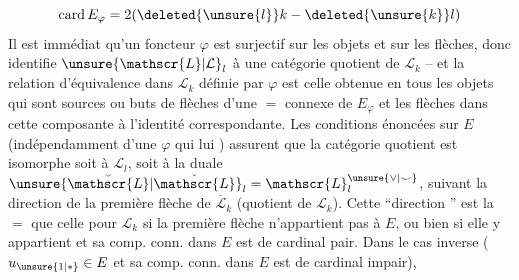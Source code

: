  
\[
\operatorname{card}E_\varphi=2(\deleted{\unsure{l}}k-\deleted{\unsure{k}}l)
\]
Il est immédiat qu'un foncteur $\varphi$ est surjectif
sur les objets et sur les flèches, donc identifie
$\unsure{\mathscr{L}|\mathcal{L}}_l$ à une catégorie quotient de $\mathscr{L}_k$ -- 
et la relation d'équivalence dans $\mathscr{L}_k$ définie
par $\varphi$ est celle obtenue en  
tous les objets qui sont sources ou buts de
flèches d'une $=$  connexe  de $E_\varphi$
\diagram{\begin{tikzcd}[ampersand replacement=\&,column sep=small]
\cdots \& {} \arrow[r,phantom] \& {} \arrow[l] \arrow[r] \& \bullet \& \bullet \arrow[l] \arrow[r] \& \bullet \& {} \arrow[l] \arrow[r] \& {} \& \cdots
\arrow[from=1-3,to=1-7,phantom,"{\underbrace{\hspace{6em}}_{I}}"']
\end{tikzcd}}
et les flèches dans cette composante à l'identité correspondante. Les conditions énoncées sur $E$
(indépendamment d'une $\varphi$ qui lui 
) assurent que la catégorie quotient
est isomorphe 
soit à $\mathscr{L}_l$, soit à la duale $\unsure{\breve{\mathscr{L}}|\check{\mathscr{L}}}_l=\mathscr{L}_l^{\unsure{\vee|\smile}}$,
suivant la direction de la première flèche de
$\overline{\mathscr{L}}_k$ (quotient de $\mathscr{L}_k$).
Cette ``direction '' est la $=$ que celle pour $\mathscr{L}_k$ si
la première flèche  n'appartient pas à $E$, ou bien
si  elle y appartient et sa comp. conn.
dans $E$ est de cardinal pair. Dans le cas
inverse ($u_{\unsure{1|*}}\in E$ et sa comp. conn. dans $E$ est de
cardinal impair),  
